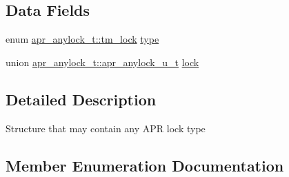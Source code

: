 \subsection*{Data Fields}
\begin{DoxyCompactItemize}
\item 
enum \hyperlink{structapr__anylock__t_a047e5c4d930f359618a96fd5e857f851}{apr\+\_\+anylock\+\_\+t\+::tm\+\_\+lock} \hyperlink{structapr__anylock__t_abe78b2ee0daaee1b19c952c4f8fc903a}{type}
\item 
union \hyperlink{unionapr__anylock__t_1_1apr__anylock__u__t}{apr\+\_\+anylock\+\_\+t\+::apr\+\_\+anylock\+\_\+u\+\_\+t} \hyperlink{structapr__anylock__t_a7064f0fcc63ef139e62260dc311687a2}{lock}
\end{DoxyCompactItemize}


\subsection{Detailed Description}
Structure that may contain any A\+PR lock type 

\subsection{Member Enumeration Documentation}
